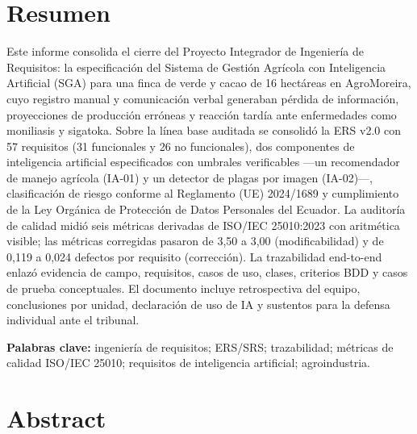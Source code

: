 \section*{Resumen}

Este informe consolida el cierre del Proyecto Integrador de Ingenier\'ia de Requisitos: la especificaci\'on del Sistema de Gesti\'on Agr\'icola con Inteligencia Artificial (SGA) para una finca de verde y cacao de 16 hect\'areas en AgroMoreira, cuyo registro manual y comunicaci\'on verbal generaban p\'erdida de informaci\'on, proyecciones de producci\'on err\'oneas y reacci\'on tard\'ia ante enfermedades como moniliasis y sigatoka. Sobre la l\'inea base auditada se consolid\'o la ERS v2.0 con 57 requisitos (31 funcionales y 26 no funcionales), dos componentes de inteligencia artificial especificados con umbrales verificables ---un recomendador de manejo agr\'icola (IA-01) y un detector de plagas por imagen (IA-02)---, clasificaci\'on de riesgo conforme al Reglamento (UE) 2024/1689 y cumplimiento de la Ley Org\'anica de Protecci\'on de Datos Personales del Ecuador. La auditor\'ia de calidad midi\'o seis m\'etricas derivadas de ISO/IEC 25010:2023 con aritm\'etica visible; las m\'etricas corregidas pasaron de 3,50 a 3,00 (modificabilidad) y de 0,119 a 0,024 defectos por requisito (correcci\'on). La trazabilidad end-to-end enlaz\'o evidencia de campo, requisitos, casos de uso, clases, criterios BDD y casos de prueba conceptuales. El documento incluye retrospectiva del equipo, conclusiones por unidad, declaraci\'on de uso de IA y sustentos para la defensa individual ante el tribunal.

\vspace{0.4cm}
\noindent\textbf{Palabras clave:} ingenier\'ia de requisitos; ERS/SRS; trazabilidad; m\'etricas de calidad ISO/IEC 25010; requisitos de inteligencia artificial; agroindustria.

\clearpage
\section*{Abstract}

